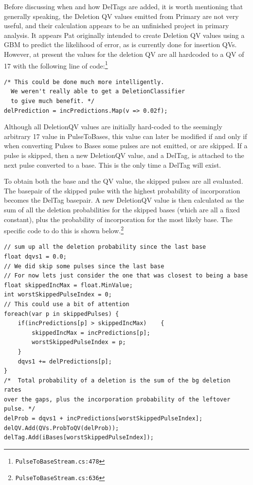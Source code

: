 \documentclass[fleqn,10pt]{SelfArx} %
\begin{document}
Before discussing when and how DelTags are added, it is worth mentioning that generally speaking, the Deletion QV values emitted from Primary are not very useful, and their calculation appears to be an unfinished project in primary analysis.  It appears Pat originally intended to create Deletion QV values using a GBM to predict the likelihood of error, as is currently done for insertion QVs.  However, at present the values for the deletion QV are all hardcoded to a QV of 17 with the following line of code:\footnote{\texttt{PulseToBaseStream.cs:478}}

\lstset{style=sharpc}
\begin{lstlisting}[frame=single]
/* This could be done much more intelligently.
  We weren't really able to get a DeletionClassifier
  to give much benefit. */
delPrediction = incPredictions.Map(v => 0.02f);
\end{lstlisting}

Although all DeletionQV values are initially hard-coded to the seemingly arbitrary 17 value in PulseToBases, this value can later be modified if and only if when converting Pulses to Bases some pulses are not emitted, or are skipped.  If a pulse is skipped, then a new DeletionQV value, and a DelTag, is attached to the next pulse converted to a base.  This is the only time a DelTag will exist.

To obtain both the base and the QV value, the skipped pulses are all evaluated.  The basepair of the skipped pulse with the highest probability of incorporation becomes the DelTag basepair.  A new DeletionQV value is then calculated as the sum of all the deletion probabilities for the skipped bases (which are all a fixed constant), plus the probability of incorporation for the most likely base.  The specific code to do this is shown below.\footnote{\texttt{PulseToBaseStream.cs:636}}

\lstset{style=sharpc}
\begin{lstlisting}[frame=single]
// sum up all the deletion probability since the last base
float dqvs1 = 0.0;
// We did skip some pulses since the last base
// For now lets just consider the one that was closest to being a base
float skippedIncMax = float.MinValue;
int worstSkippedPulseIndex = 0;
// This could use a bit of attention
foreach(var p in skippedPulses) {
    if(incPredictions[p] > skippedIncMax)    {
        skippedIncMax = incPredictions[p];
        worstSkippedPulseIndex = p;
    }
    dqvs1 += delPredictions[p];
}
/*  Total probability of a deletion is the sum of the bg deletion rates 
over the gaps, plus the incorporation probability of the leftover 
pulse. */
delProb = dqvs1 + incPredictions[worstSkippedPulseIndex];
delQV.Add(QVs.ProbToQV(delProb));
delTag.Add(iBases[worstSkippedPulseIndex]);
\end{lstlisting}
\end{document}
